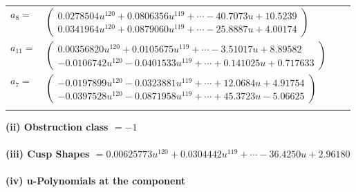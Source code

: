\documentclass[1p]{elsarticle_modified}
\theoremstyle{definition}
\begin{document}
\begin{tabular}{m{7pt} m{180pt} m{7pt} m{180pt} }
\flushright $a_{8}=$&$\begin{pmatrix}0.0278504 u^{120}+0.0806356 u^{119}+\cdots-40.7073 u+10.5239\\0.0341964 u^{120}+0.0879060 u^{119}+\cdots-25.8887 u+4.00174\end{pmatrix}$ \\
\flushright $a_{11}=$&$\begin{pmatrix}0.00356820 u^{120}+0.0105675 u^{119}+\cdots-3.51017 u+8.89582\\-0.0106742 u^{120}-0.0401533 u^{119}+\cdots+0.141025 u+0.717633\end{pmatrix}$ \\
\flushright $a_{7}=$&$\begin{pmatrix}-0.0197899 u^{120}-0.0323881 u^{119}+\cdots+12.0684 u+4.91754\\-0.0397528 u^{120}-0.0871958 u^{119}+\cdots+45.3723 u-5.06625\end{pmatrix}$\\&\end{tabular}
\flushleft \textbf{(ii) Obstruction class $= -1$}\\~\\
\flushleft \textbf{(iii) Cusp Shapes $= 0.00625773 u^{120}+0.0304442 u^{119}+\cdots-36.4250 u+2.96180$}\\~\\
\newpage\renewcommand{\arraystretch}{1}
\flushleft \textbf{(iv) u-Polynomials at the component}\newline \\
\end{document}
